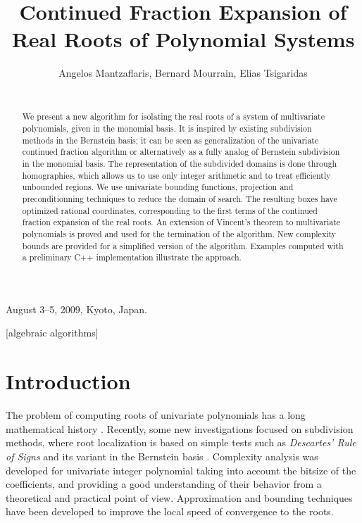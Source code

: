 \documentclass{sig-alternate}
\title{
Continued Fraction Expansion of Real Roots of Polynomial Systems
}
\author{
\alignauthor
Angelos Mantzaflaris, Bernard Mourrain, Elias Tsigaridas\\
\affaddr{GALAAD, INRIA Sophia Antipolis}\\
\email{[FirstName.LastName]@sophia.inria.fr}
}
\begin{document}
 {August 3--5, 2009, Kyoto, Japan.} 

\maketitle

\begin{abstract}
  We present a new algorithm for isolating the real roots of a system of
  multivariate polynomials, given in the monomial basis. It is inspired by
  existing subdivision methods in the Bernstein basis; it can be seen as
  generalization of the univariate continued fraction algorithm or
  alternatively as a fully analog of Bernstein subdivision in the monomial basis.
  The representation of the subdivided domains is done through homographies,
  which allows us to use only integer arithmetic and to treat efficiently
  unbounded regions.  We use univariate bounding functions, projection and
  preconditionning techniques to reduce the domain of search. The resulting
  boxes have optimized rational coordinates, corresponding to the first terms
  of the continued fraction expansion of the real roots.  An extension of
  Vincent's theorem to multivariate polynomials is proved and used for the
  termination of the algorithm. New complexity bounds are provided for a
  simplified version of the algorithm. Examples computed with 
  a preliminary C++ implementation illustrate the approach.
\end{abstract}

\vspace{-.3cm}
[algebraic algorithms]
\vspace{-.3cm}
\vspace{-.3cm}




\section{Introduction} \label{intro}


The problem of computing roots of univariate polynomials has a long
mathematical history \cite{Pan97rev}.  Recently, some new
investigations focused on subdivision methods, where root localization
is based on simple tests such as \emph{Descartes' Rule of Signs} and
its variant in the Bernstein basis \cite{MOURRAIN:2005, emt-lncs-2006,
  MR2289103}.  Complexity analysis was developed for univariate
integer polynomial taking into account the bitsize of the
coefficients, and providing a good understanding of their behavior
from a theoretical and practical point of view.  Approximation and
bounding techniques have been developed \cite{jue:07e} to improve the
local speed of convergence to the roots.
\end{document}
